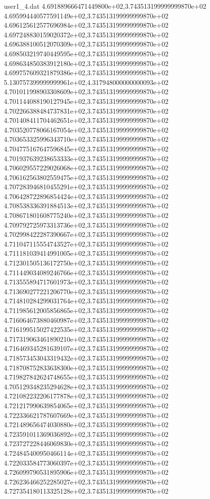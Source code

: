 \begin{filecontents}{user1_4.dat}
4.691889666471449800e+02,3.743513199999999870e+02
4.695994440577591149e+02,3.743513199999999870e+02
4.696125612577696984e+02,3.743513199999999870e+02
4.697248830159020372e+02,3.743513199999999870e+02
4.696388100512070309e+02,3.743513199999999870e+02
4.698503219740449595e+02,3.743513199999999870e+02
4.698634850383912180e+02,3.743513199999999870e+02
4.699757609321879386e+02,3.743513199999999870e+02
5.130757399999999961e+02,4.317948000000000093e+02
4.701011998903308609e+02,3.743513199999999870e+02
4.701144088190127945e+02,3.743513199999999870e+02
4.702266388484737831e+02,3.743513199999999870e+02
4.701408411704462651e+02,3.743513199999999870e+02
4.703520778066167054e+02,3.743513199999999870e+02
4.703653325996343710e+02,3.743513199999999870e+02
4.704775167647596845e+02,3.743513199999999870e+02
4.701937639238653333e+02,3.743513199999999870e+02
4.706029557229026068e+02,3.743513199999999870e+02
4.706162563802559475e+02,3.743513199999999870e+02
4.707283946810455291e+02,3.743513199999999870e+02
4.706428722896854424e+02,3.743513199999999870e+02
4.708538336391884513e+02,3.743513199999999870e+02
4.708671801608775240e+02,3.743513199999999870e+02
4.709792725973313736e+02,3.743513199999999870e+02
4.702998422287390667e+02,3.743513199999999870e+02
4.711047115554743527e+02,3.743513199999999870e+02
4.711181039414991005e+02,3.743513199999999870e+02
4.712301505136172750e+02,3.743513199999999870e+02
4.711449034089246766e+02,3.743513199999999870e+02
4.713555894717601973e+02,3.743513199999999870e+02
4.713690277221206770e+02,3.743513199999999870e+02
4.714810284299031764e+02,3.743513199999999870e+02
4.711985612005856865e+02,3.743513199999999870e+02
4.716064673880460987e+02,3.743513199999999870e+02
4.716199515027422535e+02,3.743513199999999870e+02
4.717319063461890210e+02,3.743513199999999870e+02
4.716469345281639107e+02,3.743513199999999870e+02
4.718573453043319432e+02,3.743513199999999870e+02
4.718708752833638300e+02,3.743513199999999870e+02
4.719827842624748655e+02,3.743513199999999870e+02
4.705129348235294628e+02,3.743513199999999870e+02
4.721082232206177878e+02,3.743513199999999870e+02
4.721217990639854065e+02,3.743513199999999870e+02
4.722336621787607669e+02,3.743513199999999870e+02
4.721489656474030880e+02,3.743513199999999870e+02
4.723591011369036892e+02,3.743513199999999870e+02
4.723727228446069830e+02,3.743513199999999870e+02
4.724845400950466114e+02,3.743513199999999870e+02
4.722033584773060397e+02,3.743513199999999870e+02
4.726099790531895906e+02,3.743513199999999870e+02
4.726236466252285027e+02,3.743513199999999870e+02
4.727354180113325128e+02,3.743513199999999870e+02

\end{filecontents}
